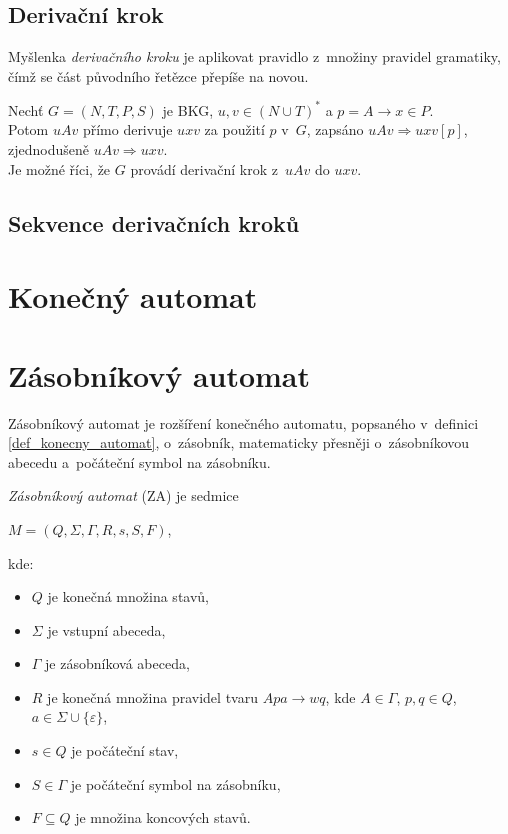 \subsection*{Derivační krok}
Myšlenka \emph{derivačního kroku} je aplikovat pravidlo z~množiny pravidel gramatiky, čímž se část původního řetězce přepíše na novou.
\begin{definition}\label{def_derivacni_krok}
    Nechť $G = (N, T, P, S)$ je BKG, $u, v \in (N \cup T)^*$ a $p = A \rightarrow x \in P$. \\
    Potom $uAv$ přímo derivuje $uxv$ za použití $p$ v~$G$, zapsáno $uAv \Rightarrow uxv [p]$, zjednodušeně $uAv \Rightarrow uxv$.\\
    Je možné říci, že $G$ provádí derivační krok z~$uAv$ do $uxv$.
\end{definition}

\subsection*{Sekvence derivačních kroků}

\section{Konečný automat}
\begin{definition}\label{def_konecny_automat}
    
\end{definition}

\section{Zásobníkový automat}\label{kap_zasobnikovy_automat}
Zásobníkový automat je rozšíření konečného automatu, popsaného v~definici \ref{def_konecny_automat}, o~zásobník, matematicky přesněji o~zásobníkovou abecedu a~počáteční symbol na zásobníku.
\begin{definition}\label{def_zasobnikovy_automat}
    \emph{Zásobníkový automat} (ZA) je sedmice 
    \begin{center}
        $M = (Q, \Sigma, \Gamma, R, s, S, F)$,
    \end{center}
    kde:
    \begin{itemize}
        \item $Q$ je konečná množina stavů,
        \item $\Sigma$ je vstupní abeceda,
        \item $\Gamma$ je zásobníková abeceda,
        \item $R$ je konečná množina pravidel tvaru $Apa \rightarrow wq$, kde $A \in \Gamma$, $p,q \in Q$, $a \in \Sigma \cup \{\varepsilon\}$,  
        \item $s \in Q$ je počáteční stav, 
        \item $S \in \Gamma$ je počáteční symbol na zásobníku,
        \item $F \subseteq Q$ je množina koncových stavů.
    \end{itemize}
\end{definition}

